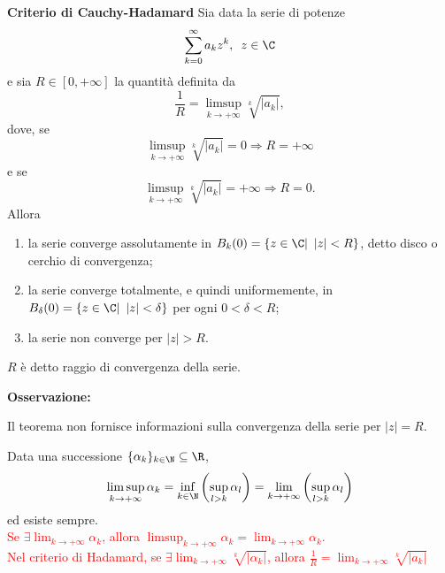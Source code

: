 \begin{theorem} \textbf{Criterio di Cauchy-Hadamard}
	Sia data la serie di potenze
	\begin{equation*}
		\sum_{k=0}^{\infty} a_kz^k,\,\,\, z \in \C
	\end{equation*}
	e sia $R\in [0,+\infty]$ la quantità definita da 
	\begin{equation*}
		\frac{1}{R}=\limsup_{k \rightarrow+\infty} \sqrt[k]{|a_k|},
	\end{equation*}
	dove, se
	\begin{equation*}
		\limsup_{k \rightarrow+\infty} \sqrt[k]{|a_k|} =0 \Rightarrow R=+\infty
	\end{equation*}
	e se
	\begin{equation*}
		\limsup_{k \rightarrow+\infty} \sqrt[k]{|a_k|} =+\infty \Rightarrow R=0.
	\end{equation*}
	Allora
	\begin{enumerate}
		\item la serie converge assolutamente in $B_k(0)=\{z\in\C|\,\,\,|z|<R\}$, detto disco o cerchio di convergenza;
		\item la serie converge totalmente, e quindi uniformemente, in $B_\delta (0)=\{z \in \C|\,\,\,|z|< \delta\}$ per ogni $0< \delta < R$;
		\item la serie non converge per $|z|>R$.
	\end{enumerate}
	$R$ è detto raggio di convergenza della serie.
\end{theorem}


\begin{attbar}
	\textbf{Osservazione:}
	
	Il teorema non fornisce informazioni sulla convergenza della serie per $|z|=R$.
\end{attbar}


\begin{definition}
	Data una successione $\{\alpha_k\}_{k\in\N}\subseteq \R$, 
	\begin{equation*}
		\limsup_{k\rightarrow+\infty} \alpha_k=\inf_{k\in\N}\left(\sup_{l>k} \alpha_l\right)=\lim_{k \rightarrow+\infty}\left(\sup_{l>k}\alpha_l\right)
	\end{equation*}
	ed esiste sempre.\\
	\textcolor{red}{Se $\exists \lim_{k\rightarrow+\infty}\alpha_k$, allora $\limsup_{k\rightarrow+\infty}\alpha_k=\lim_{k\rightarrow+\infty}\alpha_k$.\\ Nel criterio di Hadamard, se $\exists \lim_{k\rightarrow+\infty}\sqrt[k]{|\alpha_k|}$, allora $\frac{1}{R}=\lim_{k\rightarrow+\infty}\sqrt[k]{|a_k|}$}
\end{definition}


